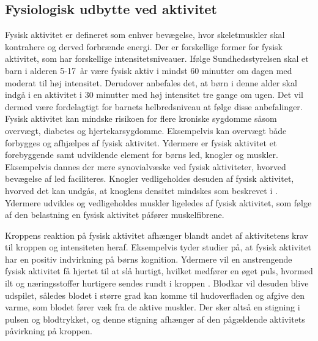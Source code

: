 \subsection{Fysiologisk udbytte ved aktivitet}\label{subsec:fysio_aktivitet}
Fysisk aktivitet er defineret som enhver bevægelse, hvor skeletmuskler skal kontrahere og derved forbrænde energi. Der er forskellige former for fysisk aktivitet, som har forskellige intensitetsniveauer. \citep{Academic2016a} Ifølge Sundhedsstyrelsen skal et barn i alderen 5-17~år være fysisk aktiv i mindst 60 minutter om dagen med moderat til høj intensitet. Derudover anbefales det, at børn i denne alder skal indgå i en aktivitet i 30 minutter med høj intensitet tre gange om ugen. Det vil dermed være fordelagtigt for barnets helbredsniveau at følge disse anbefalinger. \citep{Sundhedsstyrelsen2016}\newline
Fysisk aktivitet kan mindske risikoen for flere kroniske sygdomme såsom overvægt, diabetes og hjertekarsygdomme. Eksempelvis kan overvægt både forbygges og afhjælpes af fysisk aktivitet. Ydermere er fysisk aktivitet et forebyggende samt udviklende element for børns led, knogler og muskler. Eksempelvis dannes der mere synovialvæske ved fysisk aktiviteter, hvorved bevægelse af led faciliteres. Knogler vedligeholdes desuden af fysisk aktivitet, hvorved det kan undgås, at knoglens densitet mindskes som beskrevet i . Ydermere udvikles og vedligeholdes muskler ligeledes af fysisk aktivitet, som følge af den belastning en fysisk aktivitet påfører muskelfibrene.  %
\citep{Academic2016a,Smith1991,Academic2016b,Cotman2007,CenterforDiseaseControlandPrevention2015}

Kroppens reaktion på fysisk aktivitet afhænger blandt andet af aktivitetens krav til kroppen og intensiteten heraf. %
Eksempelvis tyder studier på, at fysisk aktivitet har en positiv indvirkning på børns kognition. \citep{SibleyEtnier2003} Ydermere vil en anstrengende fysisk aktivitet få hjertet til at slå hurtigt, hvilket medfører en øget puls, hvormed ilt og næringsstoffer hurtigere sendes rundt i kroppen \citep{Hjerteforeningen}. Blodkar vil desuden blive udspilet, således blodet i større grad kan komme til hudoverfladen og afgive den varme, som blodet fører væk fra de aktive muskler. Der sker altså en stigning i pulsen og blodtrykket, og denne stigning afhænger af den pågældende aktivitets påvirkning på kroppen. \citep{Martini2012,Stanfield2013,Berchtold2010}